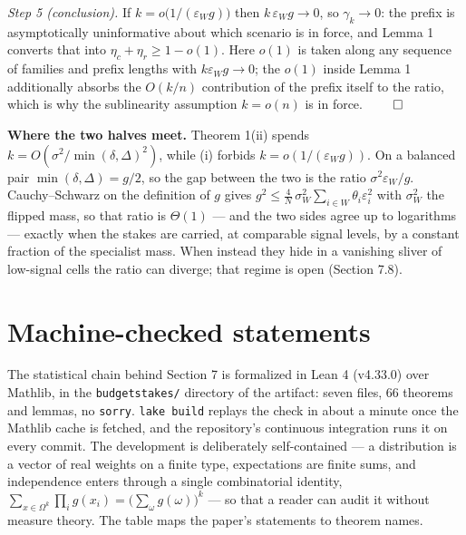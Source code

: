 \emph{Step 5 (conclusion).} If \(k=o\!\big(1/(\varepsilon_W g)\big)\)
then \(k\,\varepsilon_W g\to0\), so \(\gamma_k\to0\): the prefix is
asymptotically uninformative about which scenario is in force, and Lemma
1 converts that into \(\eta_c+\eta_r\ge1-o(1)\). Here \(o(1)\) is taken
along any sequence of families and prefix lengths with
\(k\varepsilon_W g\to0\); the \(o(1)\) inside Lemma 1 additionally
absorbs the \(O(k/n)\) contribution of the prefix itself to the ratio,
which is why the sublinearity assumption \(k=o(n)\) is in force.
\(\qed\)

\textbf{Where the two halves meet.} Theorem 1(ii) spends
\(k=O(\sigma^2/\min(\delta,\Delta)^2)\), while (i) forbids
\(k=o(1/(\varepsilon_W g))\). On a balanced pair
\(\min(\delta,\Delta)=g/2\), so the gap between the two is the ratio
\(\sigma^2\varepsilon_W/g\). Cauchy--Schwarz on the definition of \(g\)
gives
\(g^2 \le \tfrac4N\,\sigma_W^2\sum_{i\in W}\theta_i\varepsilon_i^2\)
with \(\sigma_W^2\) the flipped mass, so that ratio is \(\Theta(1)\) ---
and the two sides agree up to logarithms --- exactly when the stakes are
carried, at comparable signal levels, by a constant fraction of the
specialist mass. When instead they hide in a vanishing sliver of
low-signal cells the ratio can diverge; that regime is open (Section
7.8).

\section{Machine-checked statements}

The statistical chain behind Section 7 is formalized in Lean 4 (v4.33.0)
over Mathlib, in the \texttt{budgetstakes/} directory of the artifact:
seven files, 66 theorems and lemmas, no \texttt{sorry}.
\texttt{lake\ build} replays the check in about a minute once the
Mathlib cache is fetched, and the repository's continuous integration
runs it on every commit. The development is deliberately self-contained
--- a distribution is a vector of real weights on a finite type,
expectations are finite sums, and independence enters through a single
combinatorial identity,
\(\sum_{x\in\Omega^k}\prod_i g(x_i)=\big(\sum_\omega g(\omega)\big)^k\)
--- so that a reader can audit it without measure theory. The table maps
the paper's statements to theorem names.

